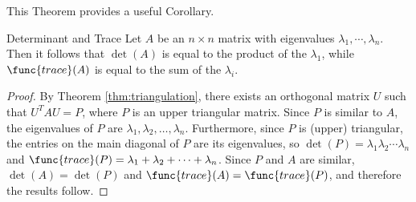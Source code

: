 This Theorem provides a useful Corollary.

\begin{corollary}{Determinant and Trace}\label{cor:dettrace}
Let $A$ be an $n \times n$ matrix with eigenvalues $\lambda_1, \cdots, \lambda_n$. Then it follows that $\det(A)$ is equal to the product of the $\lambda_1$, while $\func{trace}(A)$ is equal to the sum of the $\lambda_i$. 
\end{corollary}

\begin{proof}
By Theorem \ref{thm:triangulation}, there exists an orthogonal matrix $U$ such
that $U^TAU=P$, where $P$ is an upper triangular matrix.
Since $P$ is similar to $A$, the eigenvalues
of $P$ are $\lambda_1, \lambda_2, \ldots, \lambda_n$.
Furthermore, since $P$ is (upper) triangular, the entries on the
main diagonal of $P$ are its eigenvalues, so
$\det(P)=\lambda_1 \lambda_2 \cdots \lambda_n$ and
$\func{trace}(P)=\lambda_1 + \lambda_2 + \cdots + \lambda_n$.
Since $P$ and $A$ are similar, $\det(A)=\det(P)$ and $\func{trace}(A)=\func{trace}(P)$,
and therefore the results follow.
\end{proof}